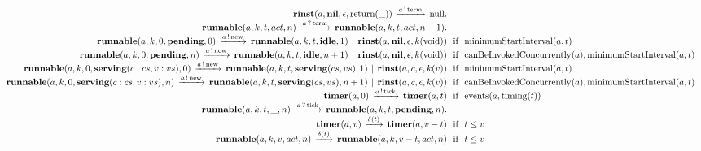 \[\begin{array}{r@{}c@{}llllll}
\\\Pfact{\Tstep{\Trinst{\Tvar{A}}{\Tnil}{\Teps}{\Treturn{\_}}}{\Tsay{\Tvar{A}}{\Tterm}}{\Tnull}}
\\\Pfact{\Tstep{\Trunnable{\Tvar{A}}{\Tvar{K}}{\Tvar{T}}{\Tvar{Act}}{\Tvar{N}}}{\Thear{\Tvar{A}}{\Tterm}}{\Trunnable{\Tvar{A}}{\Tvar{K}}{\Tvar{T}}{\Tvar{Act}}{\Tminus{\Tvar{N}}{1}}}}
\\\Prule{\Tstep{\Trunnable{\Tvar{A}}{\Tvar{K}}{0}{\Tpending}{0}}{\Tsay{\Tvar{A}}{\Tnew}}{\Tpar{\Trunnable{\Tvar{A}}{\Tvar{K}}{\Tvar{T}}{\Tidle}{1}}{\Trinst{\Tvar{A}}{\Tnil}{\Teps}{\Tap{\Tvar{K}}{\Tvoid}}}}}{\TminimumStartInterval{\Tvar{A}}{\Tvar{T}}}
\\\Prule{\Tstep{\Trunnable{\Tvar{A}}{\Tvar{K}}{0}{\Tpending}{\Tvar{N}}}{\Tsay{\Tvar{A}}{\Tnew}}{\Tpar{\Trunnable{\Tvar{A}}{\Tvar{K}}{\Tvar{T}}{\Tidle}{\Tplus{\Tvar{N}}{1}}}{\Trinst{\Tvar{A}}{\Tnil}{\Teps}{\Tap{\Tvar{K}}{\Tvoid}}}}}{\TcanBeInvokedConcurrently{\Tvar{A}},\TminimumStartInterval{\Tvar{A}}{\Tvar{T}}}
\\\Prule{\Tstep{\Trunnable{\Tvar{A}}{\Tvar{K}}{0}{\Tserving{\Tcons{\Tvar{C}}{\Tvar{Cs}}}{\Tcons{\Tvar{V}}{\Tvar{Vs}}}}{0}}{\Tsay{\Tvar{A}}{\Tnew}}{\Tpar{\Trunnable{\Tvar{A}}{\Tvar{K}}{\Tvar{T}}{\Tserving{\Tvar{Cs}}{\Tvar{Vs}}}{1}}{\Trinst{\Tvar{A}}{\Tvar{C}}{\Teps}{\Tap{\Tvar{K}}{\Tvar{V}}}}}}{\TminimumStartInterval{\Tvar{A}}{\Tvar{T}}}
\\\Prule{\Tstep{\Trunnable{\Tvar{A}}{\Tvar{K}}{0}{\Tserving{\Tcons{\Tvar{C}}{\Tvar{Cs}}}{\Tcons{\Tvar{V}}{\Tvar{Vs}}}}{\Tvar{N}}}{\Tsay{\Tvar{A}}{\Tnew}}{\Tpar{\Trunnable{\Tvar{A}}{\Tvar{K}}{\Tvar{T}}{\Tserving{\Tvar{Cs}}{\Tvar{Vs}}}{\Tplus{\Tvar{N}}{1}}}{\Trinst{\Tvar{A}}{\Tvar{C}}{\Teps}{\Tap{\Tvar{K}}{\Tvar{V}}}}}}{\TcanBeInvokedConcurrently{\Tvar{A}},\TminimumStartInterval{\Tvar{A}}{\Tvar{T}}}
\\\Prule{\Tstep{\Ttimer{\Tvar{A}}{0}}{\Tsay{\Tvar{A}}{\Ttick}}{\Ttimer{\Tvar{A}}{\Tvar{T}}}}{\Tevents{\Tvar{A}}{\Ttiming{\Tvar{T}}}}
\\\Pfact{\Tstep{\Trunnable{\Tvar{A}}{\Tvar{K}}{\Tvar{T}}{\_}{\Tvar{N}}}{\Thear{\Tvar{A}}{\Ttick}}{\Trunnable{\Tvar{A}}{\Tvar{K}}{\Tvar{T}}{\Tpending}{\Tvar{N}}}}
\\\Prule{\Tstep{\Ttimer{\Tvar{A}}{\Tvar{V}}}{\Tdelta{\Tvar{T}}}{\Ttimer{\Tvar{A}}{\Tminus{\Tvar{V}}{\Tvar{T}}}}}{\Tlesseq{\Tvar{T}}{\Tvar{V}}}
\\\Prule{\Tstep{\Trunnable{\Tvar{A}}{\Tvar{K}}{\Tvar{V}}{\Tvar{Act}}{\Tvar{N}}}{\Tdelta{\Tvar{T}}}{\Trunnable{\Tvar{A}}{\Tvar{K}}{\Tminus{\Tvar{V}}{\Tvar{T}}}{\Tvar{Act}}{\Tvar{N}}}}{\Tlesseq{\Tvar{T}}{\Tvar{V}}}

\end{array}\]
